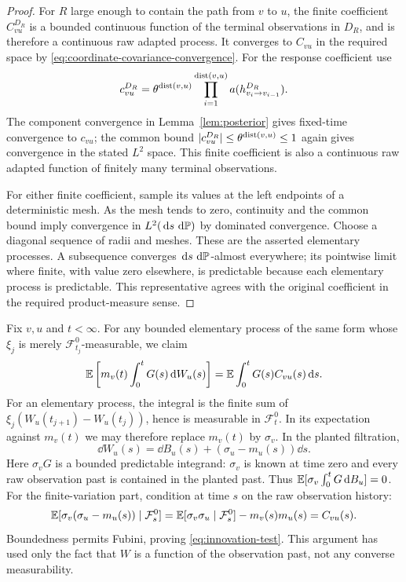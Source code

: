 \begin{proof}
For $R$ large enough to contain the path from $v$ to $u$, the finite
coefficient $C_{vu}^{D_R}$ is a bounded continuous function of the
terminal observations in $D_R$, and is therefore a continuous raw
adapted process.  It converges to $C_{vu}$ in the required space by
\eqref{eq:coordinate-covariance-convergence}.  For the response
coefficient use
\[
 c_{vu}^{D_R}=\theta^{\operatorname{dist}(v,u)}
       \prod_{i=1}^{\operatorname{dist}(v,u)}
                     a(h_{v_i\to v_{i-1}}^{D_R}).
\]
The component convergence in Lemma~\ref{lem:posterior} gives
fixed-time convergence to $c_{vu}$; the common bound
$|c_{vu}^{D_R}|\le\theta^{\operatorname{dist}(v,u)}\le1$ again gives convergence
in the stated $L^2$ space.  This finite coefficient is also a
continuous raw adapted function of finitely many terminal
observations.

For either finite coefficient, sample its values at the left
endpoints of a deterministic mesh.  As the mesh tends to zero,
continuity and the common bound imply convergence in
$L^2(\,\mathrm d s\,\,\mathrm d\mathbb P)$ by dominated convergence.  Choose a diagonal
sequence of radii and meshes.  These are the asserted elementary
processes.  A subsequence converges $\,\mathrm d s\,\,\mathrm d\mathbb P$-almost everywhere;
its pointwise limit where finite, with value zero elsewhere, is
predictable because each elementary process is predictable.  This
representative agrees with the original coefficient in the required
product-measure sense.
\end{proof}

Fix $v,u$ and $t<\infty$.  For any bounded elementary process of the
same form whose $\xi_j$ is merely
$\mathcal F_{t_j}^0$-measurable, we claim
\begin{equation}
 \label{eq:innovation-test}
 \mathbb E\left[m_v(t)\int_0^tG(s)\,\mathrm d W_u(s)\right]
       =\mathbb E\int_0^tG(s)C_{vu}(s)\,\mathrm d s.
\end{equation}
For an elementary process, the integral is the finite sum of
$\xi_j(W_u(t_{j+1})-W_u(t_j))$, hence is measurable in
$\mathcal F_t^0$.  In its expectation against $m_v(t)$ we may
therefore replace $m_v(t)$ by $\sigma_v$.  In the planted filtration,
\[
 \dd W_u(s)=\dd B_u(s)+(\sigma_u-m_u(s))\dd s.
\]
Here $\sigma_vG$ is a bounded predictable integrand: $\sigma_v$ is
known at time zero and every raw observation past is contained in the
planted past.  Thus
$\mathbb E[\sigma_v\int_0^tG\,\mathrm d B_u]=0$.  For the finite-variation part,
condition at time $s$ on the raw observation history:
\[
 \mathbb E[\sigma_v(\sigma_u-m_u(s))\mid\mathcal F_s^0]
  =\mathbb E[\sigma_v\sigma_u\mid\mathcal F_s^0]-m_v(s)m_u(s)
  =C_{vu}(s).
\]
Boundedness permits Fubini, proving \eqref{eq:innovation-test}.
This argument has used only the fact that $W$ is a function of the
observation past, not any converse measurability.

